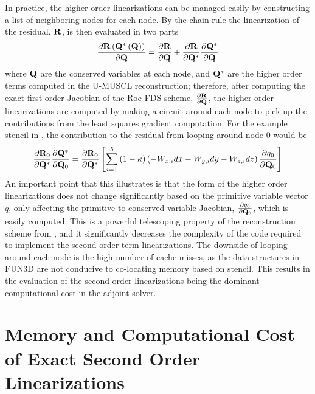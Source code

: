 In practice, the higher order linearizations can be managed easily by
constructing a list of neighboring nodes for each node.  By the chain rule the
linearization of the residual, $\mathbf R$, is then evaluated in two parts
\begin{equation}
  \frac{\partial \mathbf R\left(\mathbf Q^*\left( \mathbf Q \right) \right)}{\partial \mathbf Q} = 
  \frac{\partial \mathbf R}{\partial \mathbf Q} + \frac{\partial \mathbf R}{\partial \mathbf Q^{*}}\frac{\partial \mathbf Q^*}{\partial \mathbf Q}
  \label{residual-high-low}
\end{equation}
where $\mathbf Q$ are the conserved variables at each node, and $\mathbf Q^*$ are the higher
order terms computed in the U-MUSCL reconstruction; therefore, after computing
the exact first-order Jacobian of the Roe FDS scheme, $\frac{\partial \mathbf R}{\partial \mathbf Q}$, the
higher order linearizations are computed by making a circuit around each node to
pick up the contributions from the least squares gradient computation.  For the
example stencil in , the contribution to the residual
from looping around node 0 would be
\begin{equation}
  \frac{\partial \mathbf R_0}{\partial \mathbf Q^*}\frac{\partial \mathbf Q^*}{\partial \mathbf Q_0} = \frac{\partial \mathbf R_0}{\partial \mathbf Q^*} \left[\sum_{i=1}^5{(1-\kappa)
  \left( -W_{x,i}dx - W_{y,i}dy - W_{z,i}dz \right) \frac{\partial q_0}{\partial \mathbf Q_0}}\right]
  \label{ho-linearization}
\end{equation}
An important point that this illustrates is that the form of the higher order
linearizations does not change significantly based on the primitive variable
vector $q$, only affecting the primitive to conserved variable Jacobian,
$\frac{\partial q_0}{\partial \mathbf Q_0}$, which is easily computed.  This is a powerful telescoping
property of the reconstruction scheme from ,
and it significantly decreases the complexity of the code required to implement
the second order term linearizations.  The downside of looping around each node
is the high number of cache misses, as the data structures in FUN3D are not
conducive to co-locating memory based on stencil.  This results in the
evaluation of the second order linearizations being the dominant computational
cost in the adjoint solver.

\section{Memory and Computational Cost of Exact Second Order Linearizations}
\label{sec:2nd-order-mem-cost}

